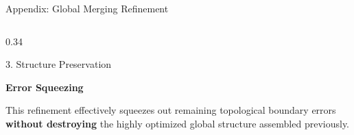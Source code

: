 \documentclass[10pt, aspectratio=169]{beamer}
\begin{document}
\begin{frame}{Appendix: Global Merging Refinement}
\begin{columns}[T]
        \begin{column}{0.34\textwidth}
            \begin{block}{3. Structure Preservation}
                \begin{minipage}[t][4.5cm][t]{\linewidth}
                    \centering
                    \vspace{0.3cm}
                    {\large \textbf{Error Squeezing}}\\[0.3cm]
                    \raggedright
                    \small This refinement effectively squeezes out remaining topological boundary errors \textbf{without destroying} the highly optimized global structure assembled previously.
                \end{minipage}
            \end{block}
        \end{column}
        
    \end{columns}
    
\end{frame}
\end{document}
